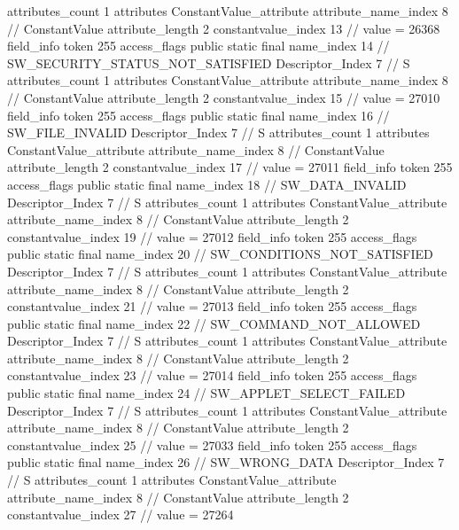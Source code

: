 {{{{{				attributes_count	1
				attributes {
				ConstantValue_attribute {
					attribute_name_index	8		// ConstantValue
					attribute_length	2
					constantvalue_index	13		// value = 26368
				}
				}
			}
			field_info {
				token	255
				access_flags	public static final
				name_index	14		// SW_SECURITY_STATUS_NOT_SATISFIED
				Descriptor_Index	7		// S
				attributes_count	1
				attributes {
				ConstantValue_attribute {
					attribute_name_index	8		// ConstantValue
					attribute_length	2
					constantvalue_index	15		// value = 27010
				}
				}
			}
			field_info {
				token	255
				access_flags	public static final
				name_index	16		// SW_FILE_INVALID
				Descriptor_Index	7		// S
				attributes_count	1
				attributes {
				ConstantValue_attribute {
					attribute_name_index	8		// ConstantValue
					attribute_length	2
					constantvalue_index	17		// value = 27011
				}
				}
			}
			field_info {
				token	255
				access_flags	public static final
				name_index	18		// SW_DATA_INVALID
				Descriptor_Index	7		// S
				attributes_count	1
				attributes {
				ConstantValue_attribute {
					attribute_name_index	8		// ConstantValue
					attribute_length	2
					constantvalue_index	19		// value = 27012
				}
				}
			}
			field_info {
				token	255
				access_flags	public static final
				name_index	20		// SW_CONDITIONS_NOT_SATISFIED
				Descriptor_Index	7		// S
				attributes_count	1
				attributes {
				ConstantValue_attribute {
					attribute_name_index	8		// ConstantValue
					attribute_length	2
					constantvalue_index	21		// value = 27013
				}
				}
			}
			field_info {
				token	255
				access_flags	public static final
				name_index	22		// SW_COMMAND_NOT_ALLOWED
				Descriptor_Index	7		// S
				attributes_count	1
				attributes {
				ConstantValue_attribute {
					attribute_name_index	8		// ConstantValue
					attribute_length	2
					constantvalue_index	23		// value = 27014
				}
				}
			}
			field_info {
				token	255
				access_flags	public static final
				name_index	24		// SW_APPLET_SELECT_FAILED
				Descriptor_Index	7		// S
				attributes_count	1
				attributes {
				ConstantValue_attribute {
					attribute_name_index	8		// ConstantValue
					attribute_length	2
					constantvalue_index	25		// value = 27033
				}
				}
			}
			field_info {
				token	255
				access_flags	public static final
				name_index	26		// SW_WRONG_DATA
				Descriptor_Index	7		// S
				attributes_count	1
				attributes {
				ConstantValue_attribute {
					attribute_name_index	8		// ConstantValue
					attribute_length	2
					constantvalue_index	27		// value = 27264
				}
				}
			}
}}}}
